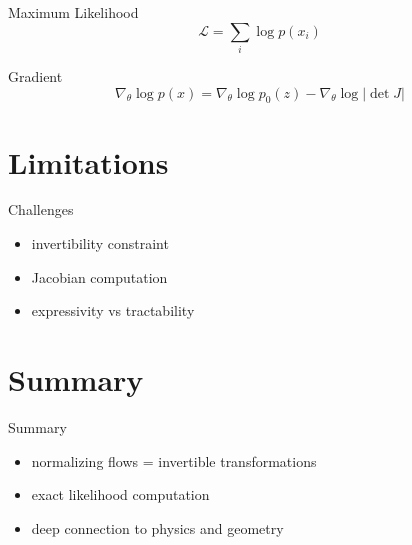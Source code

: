 \documentclass{beamer}
\begin{document}
\begin{frame}{Maximum Likelihood}
\[
\mathcal{L} = \sum_i \log p(x_i)
\]
\end{frame}


\begin{frame}{Gradient}
\[
\nabla_\theta \log p(x) =
\nabla_\theta \log p_0(z) -
\nabla_\theta \log |\det J|
\]
\end{frame}

\section{Limitations}

\begin{frame}{Challenges}
\begin{itemize}
\item invertibility constraint
\item Jacobian computation
\item expressivity vs tractability
\end{itemize}
\end{frame}

\section{Summary}

\begin{frame}{Summary}
\begin{itemize}
\item normalizing flows = invertible transformations
\item exact likelihood computation
\item deep connection to physics and geometry
\end{itemize}
\end{frame}
\end{document}
